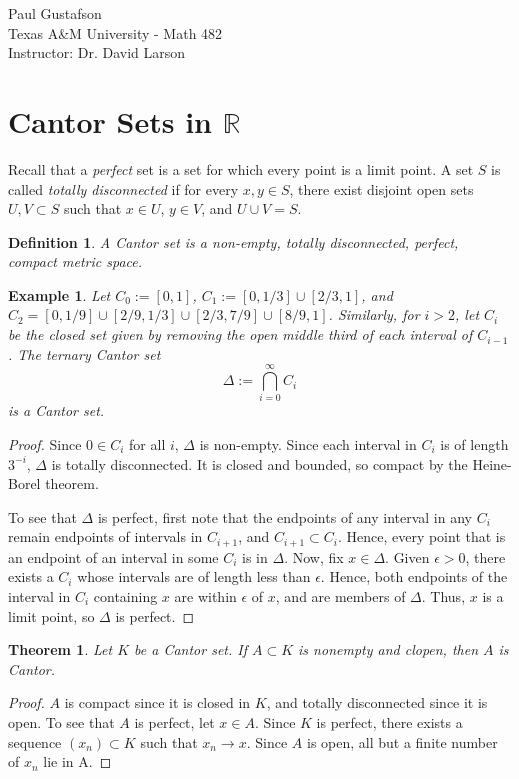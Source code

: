 \documentclass{article}
\newtheorem{theorem}{Theorem}
\newtheorem{definition}{Definition}
\newtheorem{example}{Example}
\newcommand{\R}{\mathbb{R}}
\begin{document}
\noindent Paul Gustafson\\
\noindent Texas A\&M University - Math 482 \\
\noindent Instructor: Dr. David Larson

\section*{Cantor Sets in $\R$}
Recall that a \emph{perfect} set is a set for which every point is a limit point. A set $S$ is called \emph{totally disconnected} if for every $x, y \in S$, there exist disjoint open sets $U,V \subset S$ such that $x \in U$, $y \in V$, and $U \cup V = S$.

\begin{definition}
  A \emph{Cantor set} is a non-empty, totally disconnected, perfect, compact metric space.
\end{definition}

\begin{example}
Let $C_0 := [0,1]$, $C_1 := [0,1/3] \cup [2/3, 1]$, and $C_2 = [0,1/9] \cup [2/9, 1/3] \cup [2/3, 7/9] \cup [8/9, 1]$.
Similarly, for $i > 2$, let $C_i$ be the closed set given by removing the open middle third of each interval of $C_{i-1}$.
The \emph{ternary Cantor set} $$\Delta := \bigcap_{i=0}^\infty {C_i}$$ is a Cantor set.
\end{example}
\begin{proof}
Since $0 \in C_i$ for all $i$, $\Delta$ is non-empty. Since each interval in $C_i$ is of length $3^{-i}$, $\Delta$ is totally disconnected. It is closed and bounded,
so compact by the Heine-Borel theorem. 

To see that $\Delta$ is perfect, first note that the endpoints of any interval in any $C_i$ remain endpoints of intervals in $C_{i+1}$, and $C_{i+1} \subset C_i$.
Hence, every point that is an endpoint of an interval in some $C_i$ is in $\Delta$. Now, fix $x \in \Delta$. Given $\epsilon > 0$, there exists a $C_i$ whose intervals are of length less than $\epsilon$. Hence, both endpoints of the interval in $C_i$ containing $x$ are within $\epsilon$ of $x$, and are members of $\Delta$.  Thus, $x$ is a limit point, so $\Delta$ is perfect.
\end{proof}



\begin{theorem}\label{subc}
Let $K$ be a Cantor set. If $A \subset K$ is nonempty and clopen, then $A$ is Cantor.
\end{theorem}
\begin{proof}
$A$ is compact since it is closed in $K$, and totally disconnected since it is open. 
To see that $A$ is perfect, let $x \in A$. Since $K$ is perfect, there exists a sequence $\left(x_n\right) \subset K$ such that $x_n \rightarrow x$.
Since $A$ is open, all but a finite number of $x_n$ lie in A.
\end{proof}
\end{document}
